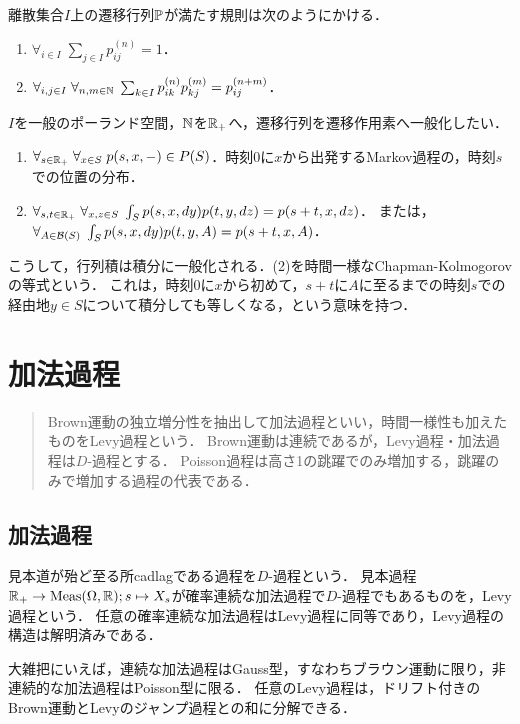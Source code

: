 \documentclass[uplatex,dvipdfmx]{jsreport}
\begin{document}
\begin{discussion}
    離散集合$I$上の遷移行列$\mathbb{P}$が満たす規則は次のようにかける．
    \begin{enumerate}
        \item $\forall_{i\in I}\;\sum_{j\in I}p_{ij}^{(n)}=1$．
        \item $\forall_{i,j\in I}\;\forall_{n,m\in\mathbb{N}}\;\sum_{k\in I}p_{ik}^{(n)}p_{kj}^{(m)}=p_{ij}^{(n+m)}$．
    \end{enumerate}
    $I$を一般のポーランド空間，$\mathbb{N}$を$\mathbb{R}_+$へ，遷移行列を遷移作用素へ一般化したい．
    \begin{enumerate}
        \item $\forall_{s\in\mathbb{R}_+}\;\forall_{x\in S}\;p(s,x,-)\in P(S)$．時刻$0$に$x$から出発するMarkov過程の，時刻$s$での位置の分布．
        \item $\forall_{s,t\in\mathbb{R}_+}\;\forall_{x,z\in S}\;\int_Sp(s,x,dy)p(t,y,dz)=p(s+t,x,dz)$．
        または，$\forall_{A\in\mathcal{B}(S)}\;\int_Sp(s,x,dy)p(t,y,A)=p(s+t,x,A)$．
    \end{enumerate}
    こうして，行列積は積分に一般化される．(2)を時間一様なChapman-Kolmogorovの等式という．
    これは，時刻$0$に$x$から初めて，$s+t$に$A$に至るまでの時刻$s$での経由地$y\in S$について積分しても等しくなる，という意味を持つ．
\end{discussion}

\chapter{加法過程}

\begin{quotation}
    Brown運動の独立増分性を抽出して加法過程といい，時間一様性も加えたものをLevy過程という．
    Brown運動は連続であるが，Levy過程・加法過程は$D$-過程とする．
    Poisson過程は高さ1の跳躍でのみ増加する，跳躍のみで増加する過程の代表である．
\end{quotation}

\section{加法過程}

\begin{tcolorbox}[colframe=ForestGreen, colback=ForestGreen!10!white,breakable,colbacktitle=ForestGreen!40!white,coltitle=black,fonttitle=\bfseries\sffamily,
title=]
    見本道が殆ど至る所cadlagである過程を$D$-過程という．
    見本過程$\mathbb{R}_+\to\mathrm{Meas}(\Omega,\mathbb{R});s\mapsto X_s$が確率連続な加法過程で$D$-過程でもあるものを，Levy過程という．
    任意の確率連続な加法過程はLevy過程に同等であり，Levy過程の構造は解明済みである．

    大雑把にいえば，連続な加法過程はGauss型，すなわちブラウン運動に限り，非連続的な加法過程はPoisson型に限る．
    任意のLevy過程は，ドリフト付きのBrown運動とLevyのジャンプ過程との和に分解できる．
\end{tcolorbox}
\end{document}
